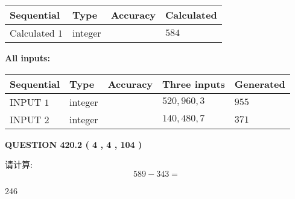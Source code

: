 \documentclass{ctexart}
\begin{document}
   
   
   
\noindent{}
   
   
  
  
\noindent\begin{tabular}{|l|l|l|l|}
\hline
 Sequential & Type & Accuracy & Calculated \\ 
\hline
 
 
  Calculated $  1 $ & integer &  & 
  $ 584 $ 
 \\  \hline  
 \end{tabular}
   
   
   
   
\noindent\vspace{0.1in}\hspace{-0.08in} {\textbf{\Large{All inputs: }}}
   
   
  
  
\noindent\begin{tabular}{|l|l|l|l|l|}
\hline
 Sequential & Type & Accuracy & Three inputs & Generated \\ 
\hline
 
 
  INPUT $  1 $ & integer &  & $
 520
 , 
 960
 , 
 3
 $ & $ 955 $ 
 \\  \hline  
 
 
  INPUT $  2 $ & integer &  & $
 140
 , 
 480
 , 
 7
 $ & $ 371 $ 
 \\  \hline  
 \end{tabular}
   
   
  
\vspace{0.2in}
  
{\textbf{\Large{QUESTION
420.2 
 ( 4 , 4 , 104 )
}}}
  
  
 
请计算:
\begin{equation}
589 -   %
343 = \nonumber
\end{equation}
 
 
 
\noindent{}
 
 

246
 
 
\noindent{}
 
 

 
 
 
\noindent{}
 
\end{document}

